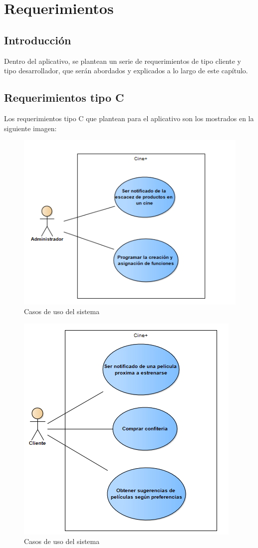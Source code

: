 \chapter{Requerimientos}
\section{Introducción}
Dentro del aplicativo, se plantean un serie de requerimientos de tipo cliente y tipo desarrollador, que serán abordados y explicados a lo largo de este capítulo.
\section{Requerimientos tipo C}
Los requerimientos tipo C que plantean para el aplicativo son los mostrados en la siguiente imagen:
\begin{figure}[h!]
	\centering
\includegraphics[width=.6\linewidth]{diseno/requerimientos/imgs/casosUso1}
	\caption{Casos de uso del sistema}
\end{figure}
\newpage
\begin{figure}[h!]
	\centering
\includegraphics[width=.6\linewidth]{diseno/requerimientos/imgs/casosUso2}
	\caption{Casos de uso del sistema}
\end{figure}


